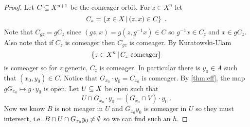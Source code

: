 \documentclass{amsart}
\begin{document}
\begin{proof}
Let $C\subseteq X^{n+1}$ be the comeager orbit. For $z\in X^n$ let
\begin{equation}
C_z = \left\{ x\in X \, \middle\vert \, \left( z,x \right)\in C \right\} \ .
\end{equation}
Note that $C_{gz} = g C_z$ since $\left( gz , x \right) = g\left( z, g^{-1} x \right)\in
C$ so $g^{-1}x \in C_z$ and $x\in g C_z$. 
Also note that if $C_z$ is comeager then $C_{gz}$ is comeager. 
By Kuratowski-Ulam 
\begin{equation}
\left\{ z\in X^n \, \middle\vert \, C_z \text{ comeager} \right\}
\end{equation}
is comeager so for $z$ generic, $C_z$ is comeager.
In particular there is $y_0\in A$ such that $\left( x_0 , y_0 \right) \in C$. 
Notice that $G_{x_0}\cdot y_0 = C_{x_0}$ is comeager.
By \cref{thm:eff}, the map $gG_{x_0}\mapsto g\cdot y_0$ is open.
Let $U\subseteq X$ be open such that 
\begin{equation}
U\cap G_{x_0}\cdot y_0 = \left( G_{x_0}\cap V \right)\cdot y_0 \ .
\end{equation}
Now we know $B$ is not meager in $U$ and $G_{x_0}y_0$ is comeager in $U$ so they must
intersect, i.e. $B\cap U\cap G_{x_0}y_0\neq \emptyset$ so we can find such an $h$.
\end{proof}
\end{document}
